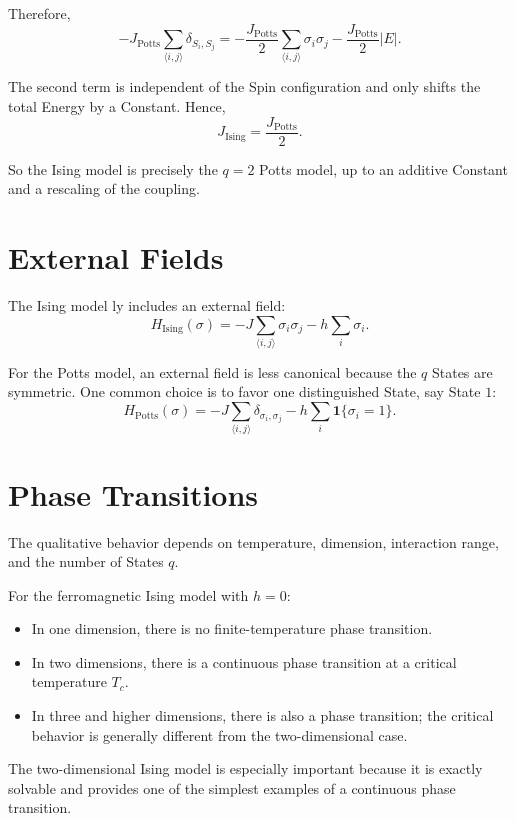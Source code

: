 \documentclass[a4paper, 10pt, onepage]{elegantbook}
\begin{document}
{Therefore,
\[
-J_{\mathrm{Potts}}\sum_{\langle i,j\rangle}\delta_{S_i,S_j}
=
-\frac{J_{\mathrm{Potts}}}{2}
\sum_{\langle i,j\rangle}\sigma_i\sigma_j
-\frac{J_{\mathrm{Potts}}}{2}|E|.
\]

The second term is independent of the Spin configuration and only shifts the
total Energy by a Constant. Hence,
\[
J_{\mathrm{Ising}}=\frac{J_{\mathrm{Potts}}}{2}.
\]

So the Ising model is precisely the \(q=2\) Potts model, up to an additive
Constant and a rescaling of the coupling.

\section{External Fields}

The Ising model ly includes an external field:
\[
H_{\mathrm{Ising}}(\sigma)
=
-J\sum_{\langle i,j\rangle}\sigma_i\sigma_j
-h\sum_i\sigma_i.
\]

For the Potts model, an external field is less canonical because the \(q\)
States are symmetric. One common choice is to favor one distinguished State,
say State \(1\):
\[
H_{\mathrm{Potts}}(\sigma)
=
-J\sum_{\langle i,j\rangle}\delta_{\sigma_i,\sigma_j}
-h\sum_i\mathbf 1\{\sigma_i=1\}.
\]

\section*{Phase Transitions}

The qualitative behavior depends on temperature, dimension, interaction range,
and the number of States \(q\).

For the ferromagnetic Ising model with \(h=0\):

\begin{itemize}
\item In one dimension, there is no finite-temperature phase transition.
\item In two dimensions, there is a continuous phase transition at a critical
temperature \(T_c\).
\item In three and higher dimensions, there is also a phase transition; the
critical behavior is generally different from the two-dimensional case.
\end{itemize}

The two-dimensional Ising model is especially important because it is exactly
solvable and provides one of the simplest examples of a continuous phase
transition.

}
\end{document}
